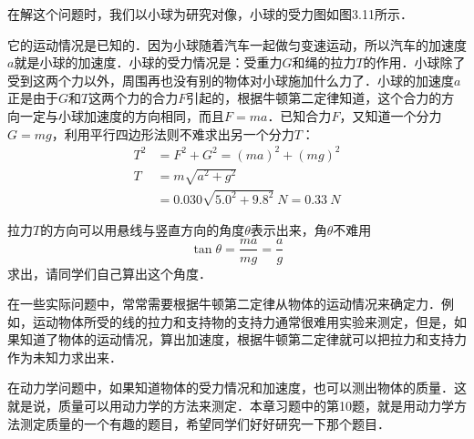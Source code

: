 \begin{Test}
\begin{Answer}
    在解这个问题时，我们以小球为研究对像，小球的受力图如图3.11所示．
    \begin{figure}[H]\centering
        \caption{}
    \end{figure}
    它的运动情况是已知的．因为小球随着汽车一起做匀变速运动，所以汽车的加速度$a$就是小球的加速度．小球的受力情况是：受重力$G$和绳的拉力$T$的作用．小球除了受到这两个力以外，周围再也没有别的物体对小球施加什么力了．小球的加速度$a$正是由于$G$和$T$这两个力的合力$F$引起的，根据牛顿第二定律知道，这个合力的方向一定与小球加速度的方向相同，而且$F=ma$．已知合力$F$，又知道一个分力$G=mg$，利用平行四边形法则不难求出另一个分力$T$：
    \begin{equation*}
        \begin{aligned}
            T^2 & =F^2+G^2=(ma)^2+(mg)^2                       \\
            T   & =m\sqrt{a^2+g^2}                             \\
                & =0.030\sqrt{5.0^2+9.8^2}~\si{N}=\SI{0.33}{N}
        \end{aligned}
    \end{equation*}
\end{Answer}
拉力$T$的方向可以用悬线与竖直方向的角度$\theta$表示出来，角$\theta$不难用
\[\tan\theta =\frac{ma}{mg}=\frac{a}{g} \]
求出，请同学们自己算出这个角度．

在一些实际问题中，常常需要根据牛顿第二定律从物体的运动情况来确定力．例如，运动物体所受的线的拉力和支持物的支持力通常很难用实验来测定，但是，如果知道了物体的运动情况，算出加速度，根据牛顿第二定律就可以把拉力和支持力作为未知力求出来．

在动力学问题中，如果知道物体的受力情况和加速度，也可以测出物体的质量．这就是说，质量可以用动力学的方法来测定．本章习题中的第10题，就是用动力学方法测定质量的一个有趣的题目，希望同学们好好研究一下那个题目．


\end{Test}
